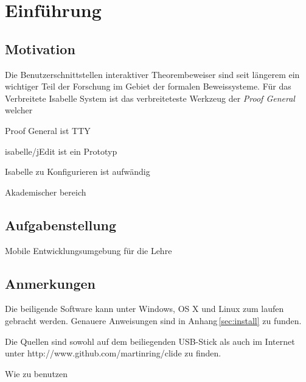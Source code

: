 \chapter{Einführung}

\section{Motivation}

Die Benutzerschnittstellen interaktiver Theorembeweiser sind seit längerem ein wichtiger Teil der
Forschung im Gebiet der formalen Beweissysteme. Für das Verbreitete Isabelle System ist das
verbreiteteste Werkzeug der \textit{Proof General} welcher

Proof General ist TTY

isabelle/jEdit ist ein Prototyp

Isabelle zu Konfigurieren ist aufwändig

Akademischer bereich

\section{Aufgabenstellung}

Mobile Entwicklungsumgebung für die Lehre



\section{Anmerkungen}

Die beiligende Software kann unter Windows, OS X und Linux zum laufen gebracht werden. Genauere
Anweisungen sind in Anhang\,\ref{sec:install} zu funden.

Die Quellen sind sowohl auf dem beiliegenden USB-Stick als auch im Internet unter
http://www.github.com/martinring/clide zu finden.

Wie zu benutzen
